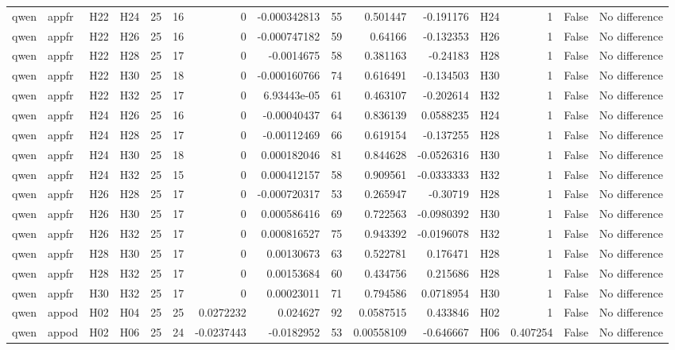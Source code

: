 \begin{longtable}{llllrrrrrrrlrrl}
qwen & appfr & H22 & H24 & 25 & 16 & 0 & -0.000342813 & 55 & 0.501447 & -0.191176 & H24 & 1 & False & No difference \\
qwen & appfr & H22 & H26 & 25 & 16 & 0 & -0.000747182 & 59 & 0.64166 & -0.132353 & H26 & 1 & False & No difference \\
qwen & appfr & H22 & H28 & 25 & 17 & 0 & -0.0014675 & 58 & 0.381163 & -0.24183 & H28 & 1 & False & No difference \\
qwen & appfr & H22 & H30 & 25 & 18 & 0 & -0.000160766 & 74 & 0.616491 & -0.134503 & H30 & 1 & False & No difference \\
qwen & appfr & H22 & H32 & 25 & 17 & 0 & 6.93443e-05 & 61 & 0.463107 & -0.202614 & H32 & 1 & False & No difference \\
qwen & appfr & H24 & H26 & 25 & 16 & 0 & -0.00040437 & 64 & 0.836139 & 0.0588235 & H24 & 1 & False & No difference \\
qwen & appfr & H24 & H28 & 25 & 17 & 0 & -0.00112469 & 66 & 0.619154 & -0.137255 & H28 & 1 & False & No difference \\
qwen & appfr & H24 & H30 & 25 & 18 & 0 & 0.000182046 & 81 & 0.844628 & -0.0526316 & H30 & 1 & False & No difference \\
qwen & appfr & H24 & H32 & 25 & 15 & 0 & 0.000412157 & 58 & 0.909561 & -0.0333333 & H32 & 1 & False & No difference \\
qwen & appfr & H26 & H28 & 25 & 17 & 0 & -0.000720317 & 53 & 0.265947 & -0.30719 & H28 & 1 & False & No difference \\
qwen & appfr & H26 & H30 & 25 & 17 & 0 & 0.000586416 & 69 & 0.722563 & -0.0980392 & H30 & 1 & False & No difference \\
qwen & appfr & H26 & H32 & 25 & 17 & 0 & 0.000816527 & 75 & 0.943392 & -0.0196078 & H32 & 1 & False & No difference \\
qwen & appfr & H28 & H30 & 25 & 17 & 0 & 0.00130673 & 63 & 0.522781 & 0.176471 & H28 & 1 & False & No difference \\
qwen & appfr & H28 & H32 & 25 & 17 & 0 & 0.00153684 & 60 & 0.434756 & 0.215686 & H28 & 1 & False & No difference \\
qwen & appfr & H30 & H32 & 25 & 17 & 0 & 0.00023011 & 71 & 0.794586 & 0.0718954 & H30 & 1 & False & No difference \\
qwen & appod & H02 & H04 & 25 & 25 & 0.0272232 & 0.024627 & 92 & 0.0587515 & 0.433846 & H02 & 1 & False & No difference \\
qwen & appod & H02 & H06 & 25 & 24 & -0.0237443 & -0.0182952 & 53 & 0.00558109 & -0.646667 & H06 & 0.407254 & False & No difference \\

\end{longtable}
